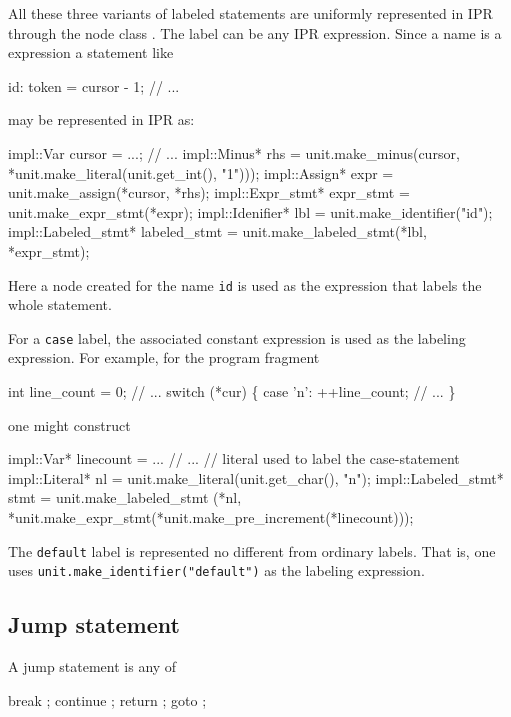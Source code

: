 \documentclass[11pt]{article}
\begin{document}
All these three variants of labeled statements are uniformly represented in
IPR through the node class .  The label can be any
IPR expression.  Since a name is a expression a statement like 
\begin{Program}
  id:
     token = cursor - 1;
     // ...
\end{Program}
may be represented in IPR as:
\begin{Program}
  impl::Var cursor = ...;
  // ...
  impl::Minus* rhs = unit.make_minus(cursor, 
                                     *unit.make_literal(unit.get_int(), "1")));
  impl::Assign* expr = unit.make_assign(*cursor, *rhs);
  impl::Expr_stmt* expr_stmt = unit.make_expr_stmt(*expr);
  impl::Idenifier* lbl = unit.make_identifier("id");
  impl::Labeled_stmt* labeled_stmt = unit.make_labeled_stmt(*lbl, *expr_stmt);
\end{Program}
Here a node created for the name \texttt{id} is used as the expression
that labels the whole statement.

For a \texttt{case} label, the associated constant expression is used as the
labeling expression.  For example, for the program fragment
\begin{Program}
  int line_count = 0;
  // ...
  switch (*cur) \{
    case '{\bslash}n':
       ++line_count;
       // ...
  \}
\end{Program}
one might construct
\begin{Program}
  impl::Var* linecount = ...
  // ...
  // literal used to label the case-statement
  impl::Literal* nl = unit.make_literal(unit.get_char(), "{\bslash\bslash}n");
  impl::Labeled_stmt* stmt = unit.make_labeled_stmt
     (*nl, *unit.make_expr_stmt(*unit.make_pre_increment(*linecount)));
\end{Program}

The \texttt{default} label is represented no different from ordinary labels.
That is, one uses \verb=unit.make_identifier("default")= as the labeling
expression. 


\subsection{Jump statement}
\label{sec:stmt.jump}

A jump statement is any of
\begin{Grammar}
      break ;
      continue ;
      return  ;
      goto  ;
\end{Grammar}
\end{document}
